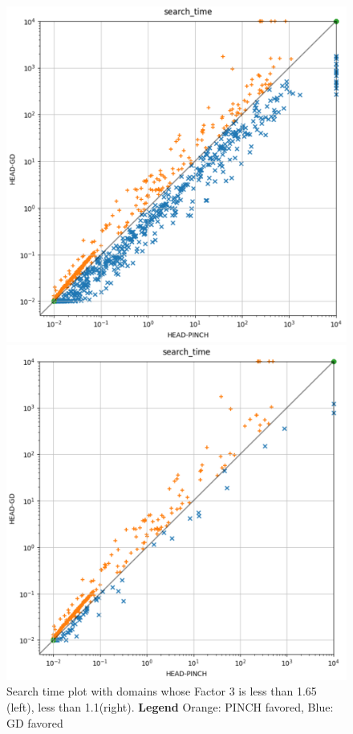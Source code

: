 \begin{figure}[h]
  \centering
  \begin{minipage}[b]{0.40\textwidth}
    \includegraphics[width=\textwidth]{OP11.PNG}
  \end{minipage}
  \hfill
  \begin{minipage}[b]{0.40\textwidth}
    \includegraphics[width=\textwidth]{OP165.PNG}
    \caption{Search time plot with domains whose Factor 3 is less than 1.65 (left), less than 1.1(right). \textbf{Legend} Orange: PINCH favored, Blue: GD favored}
  \end{minipage}
\end{figure}\\
